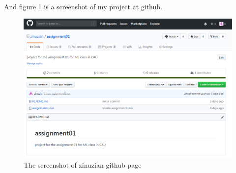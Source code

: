 \documentclass{article}
\begin{document}
And figure \ref{fig:screenshot} is a screenshot of my project at github.
\begin{figure}[h!]
\centering
\includegraphics[scale=0.5]{sc}
\caption{The screenshot of zinuzian github page}
\label{fig:screenshot}
\end{figure}



\end{document}
